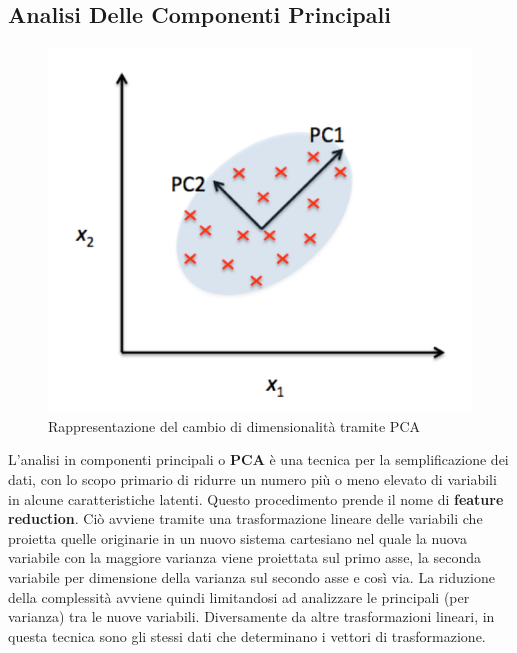 \subsection{Analisi Delle Componenti Principali}
\begin{figure}[]
	\centering
	\includegraphics[scale=0.8]{images/pca.png}
	\caption{Rappresentazione del cambio di dimensionalità tramite PCA}
\end{figure}
L'analisi in componenti principali o \textbf{PCA} è una tecnica per la semplificazione dei dati, con lo scopo primario di ridurre un numero più o meno elevato di variabili in alcune caratteristiche latenti. Questo procedimento prende il nome di \textbf{feature reduction}. Ciò avviene tramite una trasformazione lineare delle variabili che proietta quelle originarie in un nuovo sistema cartesiano nel quale la nuova variabile con la maggiore varianza viene proiettata sul primo asse, la seconda variabile per dimensione della varianza sul secondo asse e così via. La riduzione della complessità avviene quindi limitandosi ad analizzare le principali (per varianza) tra le nuove variabili. Diversamente da altre trasformazioni lineari, in questa tecnica sono gli stessi dati che determinano i vettori di trasformazione.\\
